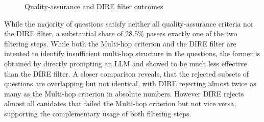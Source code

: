 \begin{figure}[H]
    \raggedright

    \caption{Quality-assurance and DIRE filter outcomes}
\end{figure}

While the majority of questions satisfy neither all quality-assurance criteria nor the DIRE filter, a substantial share of 28.5\% passes exactly one of the two filtering steps. While both the Multi-hop criterion and the DIRE filter are intented to identify insufficient multi-hop structure in the questions, the former is obtained by directly prompting an LLM and showed to be much less effective than the DIRE filter. A closer comparison reveals, that the rejected subsets of questions are overlapping but not identical, with DIRE rejecting almost twice as many as the Multi-hop criterion in absolute numbers. However DIRE rejects almost all canidates that failed the Multi-hop criterion but not vice versa, supporting the complementary usage of both filtering steps.

